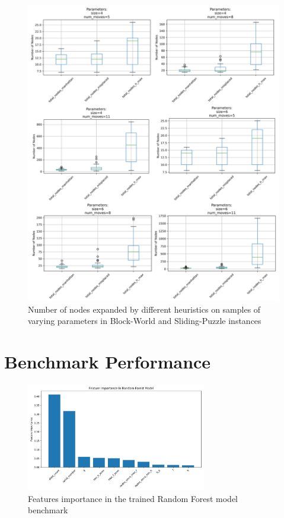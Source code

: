 \documentclass[letterpaper]{article}
\begin{document}
\begin{figure}[ht]
\begin{minipage}{0.39\textwidth}
        \includegraphics[width=\textwidth]{plots/sliding_puzzle_nodes_expanded_2.png}
    \end{minipage}
    \caption{Number of nodes expanded by different heuristics on samples of varying parameters in Block-World and Sliding-Puzzle instances}
    \label{fig:heuristic-expanded}
\end{figure}

\section{Benchmark Performance}

\begin{figure}[H]
    \centering
    \includegraphics[width=0.7\textwidth]{plots/feature_importance_rf.png}
    \caption{Features importance in the trained Random Forest model benchmark}
    \label{fig:rf_features}
\end{figure}
\end{document}
